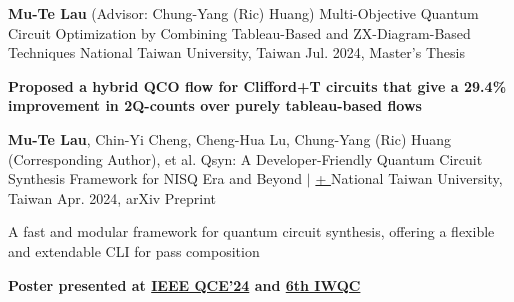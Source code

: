 \begin{cventries}
    \cventry
        {\textbf{Mu-Te Lau} (Advisor: Chung-Yang (Ric) Huang)}
        {Multi-Objective Quantum Circuit Optimization by Combining Tableau-Based and ZX-Diagram-Based Techniques
        \href{https://tdr.lib.ntu.edu.tw/handle/123456789/95208}{\faLink}}
        {National Taiwan University, Taiwan}
        {Jul. 2024, Master's Thesis}
        {
            \begin{cvitems}
               \item \textcolor{awesome}{\textbf{Proposed a hybrid QCO flow for Clifford+T circuits that give a 29.4\% improvement in 2Q-counts over purely tableau-based flows}}
            \end{cvitems}
        }
        
    \cventry
        {\textbf{Mu-Te Lau}, Chin-Yi Cheng, Cheng-Hua Lu, Chung-Yang (Ric) Huang (Corresponding Author), et al.}
        {Qsyn: A Developer-Friendly Quantum Circuit Synthesis Framework for NISQ Era and Beyond 
        \href{https://arxiv.org/abs/2405.07197}{\faLink} 
        $|$ 
        \href{https://github.com/DVLab-NTU/qsyn}{+ \raisebox{0.1em}{\textbf{$\star$}}}}
        {National Taiwan University, Taiwan}
        {Apr. 2024, arXiv Preprint}
        {
            \begin{cvitems}
                \item A fast and modular framework for quantum circuit synthesis, offering a flexible and extendable CLI for pass composition
                \item \textcolor{awesome}{\textbf{Poster presented at \href{https://qce.quantum.ieee.org/2024/posters-program/}{IEEE QCE'24} and \href{https://quantum-compilers.github.io/iwqc2024/posters.html}{6th IWQC}}}
            \end{cvitems}
        }
        
\end{cventries}